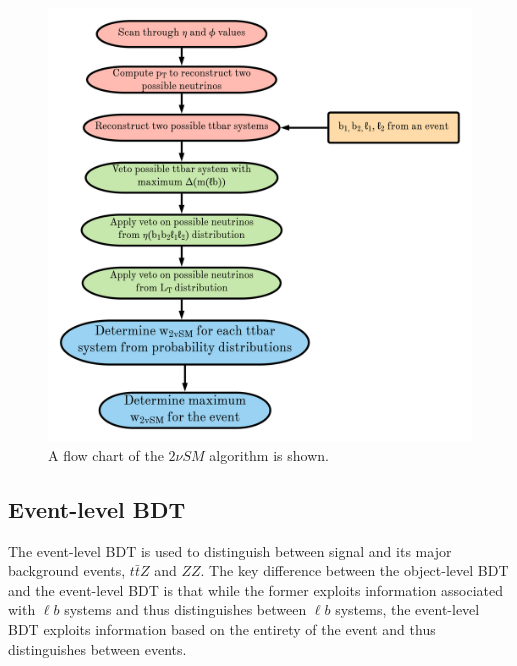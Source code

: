 \begin{figure}[h!]
	\includegraphics[width=0.5\linewidth]{figures/2vsm_flow.png}
	\centering
	\caption{A flow chart of the $2\nu SM$ algorithm is shown.}
	\label{fig:2vsm-flow}
\end{figure}


\subsection{Event-level BDT}
\label{sec:event-level-bdt}
The event-level BDT is used to distinguish between signal and its major background events, $t\bar{t}Z$ and $ZZ$. The key difference between the object-level BDT and the event-level BDT is that while the former exploits information associated with $\ell b$ systems and thus distinguishes between $\ell b$ systems, the event-level BDT exploits information based on the entirety of the event and thus distinguishes between events.\\

